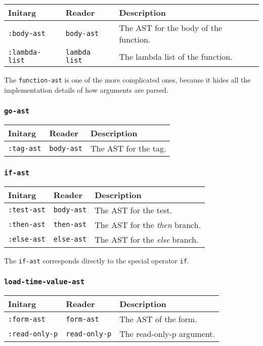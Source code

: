 \begin{tabular}{|l|l|l|}
\hline
Initarg & Reader & Description\\
\hline\hline
\texttt{:body-ast} & \texttt{body-ast} & The AST for the body of the function.\\
\hline
\texttt{:lambda-list} & \texttt{lambda list} & The lambda list of the function.\\
\hline
\end{tabular}

The \texttt{function-ast} is one of the more complicated ones, because
it hides all the implementation details of how arguments are parsed. 

\subsubsection{\texttt{go-ast}}
\label{go-ast}

\begin{tabular}{|l|l|l|}
\hline
Initarg & Reader & Description\\
\hline\hline
\texttt{:tag-ast} & \texttt{body-ast} & The AST for the tag.\\
\hline
\end{tabular}

\subsubsection{\texttt{if-ast}}
\label{if-ast}

\begin{tabular}{|l|l|l|}
\hline
Initarg & Reader & Description\\
\hline\hline
\texttt{:test-ast} & \texttt{body-ast} & The AST for the test.\\
\hline
\texttt{:then-ast} & \texttt{then-ast} & The AST for the \emph{then} branch.\\
\hline
\texttt{:else-ast} & \texttt{else-ast} & The AST for the \emph{else} branch.\\
\hline
\end{tabular}

The \texttt{if-ast} corresponds directly to the \commonlisp{} special operator
\texttt{if}. 

\subsubsection{\texttt{load-time-value-ast}}
\label{load-time-value-ast}

\begin{tabular}{|l|l|l|}
\hline
Initarg & Reader & Description\\
\hline\hline
\texttt{:form-ast} & \texttt{form-ast} & The AST of the form.\\
\texttt{:read-only-p} & \texttt{read-only-p} & The read-only-p argument.\\
\hline
\end{tabular}

